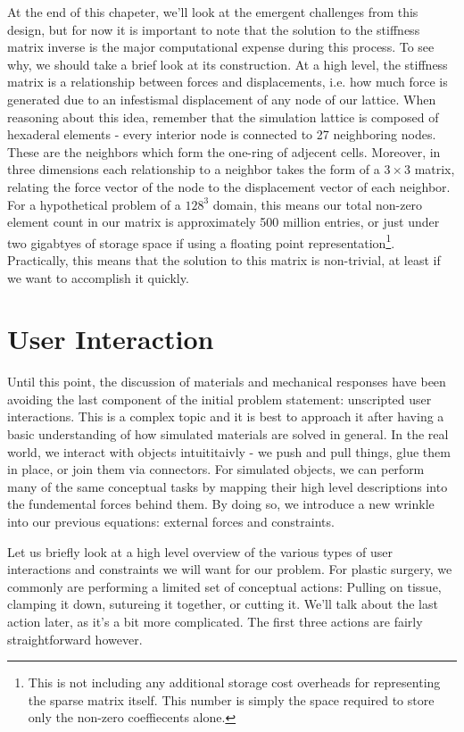 \documentclass[12pt,oneside,letterpaper]{memoir}
\begin{document}
  At the end of this chapeter, we'll look at the emergent challenges
  from this design, but for now it is important to note that the
  solution to the stiffness matrix inverse is the major computational
  expense during this process. To see why, we should take a brief look
  at its construction. At a high level, the stiffness matrix is a
  relationship between forces and displacements, i.e. how much force
  is generated due to an infestismal displacement of any node of our
  lattice. When reasoning about this idea, remember that the
  simulation lattice is composed of hexaderal elements - every
  interior node is connected to 27 neighboring nodes. These are the
  neighbors which form the one-ring of adjecent cells. Moreover, in
  three dimensions each relationship to a neighbor takes the form of a
  $3 \times 3$ matrix, relating the force vector of the node to the
  displacement vector of each neighbor. For a hypothetical problem of
  a $128^3$ domain, this means our total non-zero element count in our
  matrix is approximately 500 million entries, or just under two
  gigabtyes of storage space if using a floating point
  representation\footnote{This is not including any additional storage
    cost overheads for representing the sparse matrix itself. This
    number is simply the space required to store only the non-zero
    coeffiecents alone.}. Practically, this means that the solution to
  this matrix is non-trivial, at least if we want to accomplish it
  quickly.

  \section{User Interaction}

  Until this point, the discussion of materials and mechanical
  responses have been avoiding the last component of the initial
  problem statement: unscripted user interactions. This is a complex
  topic and it is best to approach it after having a basic
  understanding of how simulated materials are solved in general. In
  the real world, we interact with objects intuititaivly - we push and
  pull things, glue them in place, or join them via connectors. For
  simulated objects, we can perform many of the same conceptual tasks
  by mapping their high level descriptions into the fundemental forces
  behind them. By doing so, we introduce a new wrinkle into
  our previous equations: external forces and constraints.

  Let us briefly look at a high level overview of the various types of
  user interactions and constraints we will want for our problem. For
  plastic surgery, we commonly are performing a limited set of
  conceptual actions: Pulling on tissue, clamping it down, sutureing
  it together, or cutting it. We'll talk about the last action later,
  as it's a bit more complicated. The first three actions are fairly
  straightforward however.
\end{document}
